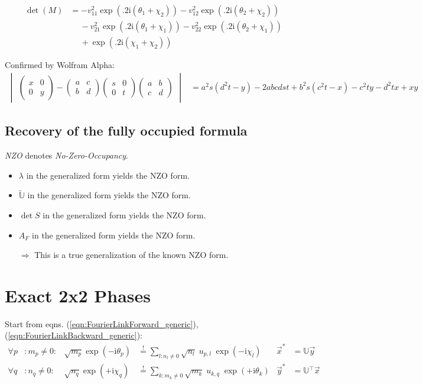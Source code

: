 \documentclass[
	english,
	a4paper,
	fontsize=10pt,
	parskip=half,
	titlepage=true,
	DIV=12,
	final
]{scrreprt}
\newcommand*{\Thus}{\ensuremath{\Rightarrow}\xspace}
\newcommand*{\transp}{\ensuremath{^\intercal}}
\newcommand*{\iunit}{\ensuremath{\mathrm{i}}}
\newcommand*{\equalCond}{  \mathop{=}\limits^!  }
\begin{document}
\begin{align}
\nonumber
	\det(M)
&=
	- v_{11}^2 \exp(\Big. 2\iunit (\theta_1 + \chi_2))
	- v_{12}^2 \exp(\Big. 2\iunit (\theta_2 + \chi_2)) \\
&\quad~
\nonumber
	- v_{21}^2 \exp(\Big. 2\iunit (\theta_1 + \chi_1))
	- v_{22}^2 \exp(\Big. 2\iunit (\theta_2 + \chi_1)) \\
&\quad~
	+ \exp(\Big. 2\iunit (\chi_1 + \chi_2))
\end{align}

Confirmed by Wolfram Alpha:
\begin{align*}
	\begin{vmatrix}
		\begin{pmatrix}
			x & 0 \\ 0 & y
		\end{pmatrix}
		-
		\begin{pmatrix}
			a & c \\ b & d
		\end{pmatrix}
		\begin{pmatrix}
			s & 0 \\ 0 & t
		\end{pmatrix}
		\begin{pmatrix}
			a & b \\ c & d
		\end{pmatrix}
	\end{vmatrix}
&=
	a^2 s (d^2 t - y) - 2 a b c d s t + b^2 s (c^2 t - x) - c^2 t y - d^2 t x + x y
\end{align*}

\section{Recovery of the fully occupied formula}
\emph{NZO} denotes \emph{No-Zero-Occupancy}.
\begin{itemize}
\item $\lambda$ in the generalized form yields the NZO form.
\item $\tilde{\mathbb{U}}$ in the generalized form yields the NZO form.
\item $\det S$ in the generalized form yields the NZO form.
\item $A_F$ in the generalized form yields the NZO form.
\item[\Thus] This is a true generalization of the known NZO form.
\end{itemize}

\chapter{Exact 2x2 Phases}
Start from eqns. (\ref{eqn:FourierLinkForward_generic}), (\ref{eqn:FourierLinkBackward_generic}):
\begin{align*}
	\forall p &: m_p \neq 0 :
&
	\sqrt{m_p} \exp(-\iunit \theta_p)
&\equalCond
	\sum_{l : n_l \neq 0} \sqrt{n_l} \; u_{p,l} \; \exp(-\iunit\chi_l)
&
	\vec{x}^{*} &= \mathbb{U} \vec{y}
\\
	\forall q &: n_q \neq 0 :
&
	\sqrt{n_q} \exp(+\iunit \chi_q)
&\equalCond
	\sum_{k : m_k \neq 0}
	\sqrt{m_k} \; u_{k,q} \; \exp(+\iunit\theta_k)
&
	\vec{y}^{*} &= \mathbb{U}\transp \vec{x}
\end{align*}
\end{document}
